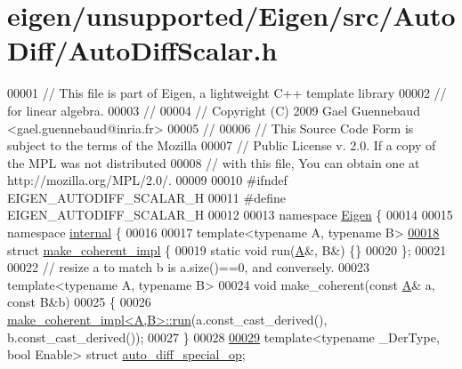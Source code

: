 \hypertarget{eigen_2unsupported_2_eigen_2src_2_auto_diff_2_auto_diff_scalar_8h_source}{}\section{eigen/unsupported/\+Eigen/src/\+Auto\+Diff/\+Auto\+Diff\+Scalar.h}
\label{eigen_2unsupported_2_eigen_2src_2_auto_diff_2_auto_diff_scalar_8h_source}

\begin{DoxyCode}
00001 \textcolor{comment}{// This file is part of Eigen, a lightweight C++ template library}
00002 \textcolor{comment}{// for linear algebra.}
00003 \textcolor{comment}{//}
00004 \textcolor{comment}{// Copyright (C) 2009 Gael Guennebaud <gael.guennebaud@inria.fr>}
00005 \textcolor{comment}{//}
00006 \textcolor{comment}{// This Source Code Form is subject to the terms of the Mozilla}
00007 \textcolor{comment}{// Public License v. 2.0. If a copy of the MPL was not distributed}
00008 \textcolor{comment}{// with this file, You can obtain one at http://mozilla.org/MPL/2.0/.}
00009 
00010 \textcolor{preprocessor}{#ifndef EIGEN\_AUTODIFF\_SCALAR\_H}
00011 \textcolor{preprocessor}{#define EIGEN\_AUTODIFF\_SCALAR\_H}
00012 
00013 \textcolor{keyword}{namespace }\hyperlink{namespace_eigen}{Eigen} \{
00014 
00015 \textcolor{keyword}{namespace }\hyperlink{namespaceinternal}{internal} \{
00016 
00017 \textcolor{keyword}{template}<\textcolor{keyword}{typename} A, \textcolor{keyword}{typename} B>
\hyperlink{struct_eigen_1_1internal_1_1make__coherent__impl}{00018} \textcolor{keyword}{struct }\hyperlink{struct_eigen_1_1internal_1_1make__coherent__impl}{make\_coherent\_impl} \{
00019   \textcolor{keyword}{static} \textcolor{keywordtype}{void} run(\hyperlink{group___core___module_class_eigen_1_1_matrix}{A}&, B&) \{\}
00020 \};
00021 
00022 \textcolor{comment}{// resize a to match b is a.size()==0, and conversely.}
00023 \textcolor{keyword}{template}<\textcolor{keyword}{typename} A, \textcolor{keyword}{typename} B>
00024 \textcolor{keywordtype}{void} make\_coherent(\textcolor{keyword}{const} \hyperlink{group___core___module_class_eigen_1_1_matrix}{A}& a, \textcolor{keyword}{const} B&b)
00025 \{
00026   \hyperlink{struct_eigen_1_1internal_1_1make__coherent__impl}{make\_coherent\_impl<A,B>::run}(a.const\_cast\_derived(), b.const\_cast\_derived());
00027 \}
00028 
\hyperlink{struct_eigen_1_1internal_1_1auto__diff__special__op}{00029} \textcolor{keyword}{template}<\textcolor{keyword}{typename} \_DerType, \textcolor{keywordtype}{bool} Enable> \textcolor{keyword}{struct }\hyperlink{struct_eigen_1_1internal_1_1auto__diff__special__op}{auto\_diff\_special\_op};

\end{DoxyCode}
